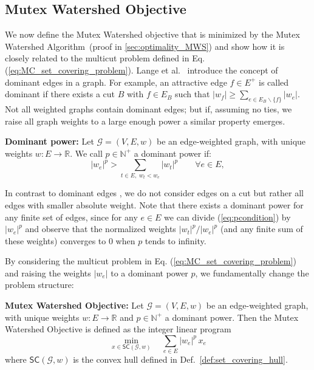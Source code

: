 \subsection{Mutex Watershed Objective}\label{sec:MWS_objective_sub}

We now define the Mutex Watershed objective that is minimized by the Mutex Watershed Algorithm~(proof in \autoref{sec:optimality_MWS}) and show how it is closely related to the multicut problem defined in Eq. (\ref{eq:MC_set_covering_problem}). 
Lange et al.\ \cite{lange2018partial} introduce the concept of dominant edges in a graph. For example, an attractive edge $f \in E^+$ is called dominant if 
there exists a cut $B$ with $f \in E_B$ such that 
$|w_{f}| \geq \sum_{e \in E_{B} \backslash\{f\}}\left|w_{e}\right|$.
Not all weighted graphs contain dominant edges; but if, assuming no ties, we raise all graph weights to a large enough power a similar property emerges.
\begin{definition}\label{def:pineq}
\textbf{Dominant power:}
Let $\mathcal{G} = (V, E, w)$ be an edge-weighted graph, with unique weights $w: E \rightarrow \mathbb{R}$. We call $p \in \mathbb{N}^+$ a dominant power if:
\begin{equation}
    |w_e|^p > \sum_{t \in E,\; w_t < w_e} |w_t|^p \qquad \forall e \in E, \label{eq:pcondition}
\end{equation}
\end{definition}
 \noindent In contrast to dominant edges \cite{lange2018partial}, we do not consider edges on a cut but rather all edges with smaller absolute weight. Note that there exists a dominant power for any finite set of edges, since for any $e \in E$ we can divide (\ref{eq:pcondition}) by $|w_e|^p$ and observe that the normalized weights $|w_t|^p/|w_e|^p$ (and any finite sum of these weights) converges to 0 when $p$ tends to infinity. 

 By considering the multicut problem in Eq. (\ref{eq:MC_set_covering_problem}) and raising the weights $|w_e|$ to a dominant power $p$, we fundamentally change the problem structure:
 \begin{definition}\label{def:MWS_objective}
\textbf{Mutex Watershed Objective:}
Let $\mathcal{G} = (V, E, w)$ be an edge-weighted graph, with unique weights $w:E \rightarrow \mathbb{R}$ and $p \in \mathbb{N}^+$ a dominant power. Then the Mutex Watershed Objective is defined as the integer linear program
\begin{equation}
  \min_{x \in \mathsf{SC}(\mathcal{G}, w)} \quad \sum_{e \in E}  |w_e|^p \, x_e  \label{eq:MWS_objective_SC}
\end{equation}
where $\mathsf{SC}(\mathcal{G}, w)$ is the convex hull defined in Def.~\ref{def:set_covering_hull}.
\end{definition}

